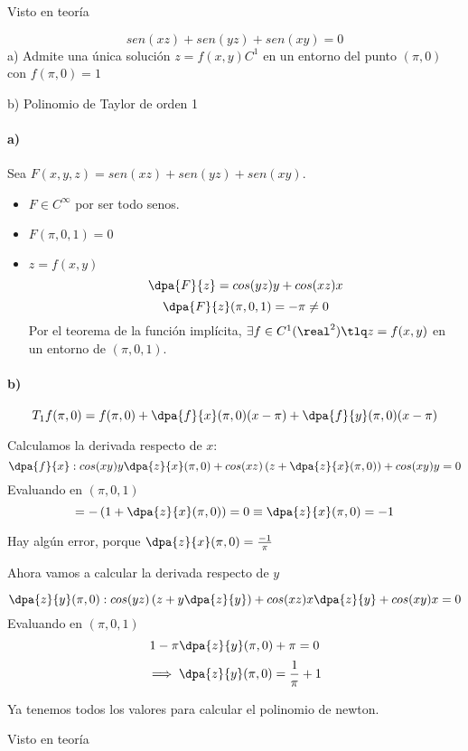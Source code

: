  \begin{problem}[14]
 \solution
 Visto en teoría
 \end{problem}
 
\begin{problem}[15]
\[sen(xz)+sen(yz)+sen(xy) = 0\]
a) Admite una única solución $z=f(x,y) C^1$ en un entorno del punto $(\pi,0)$ con $f(\pi,0) = 1$

b) Polinomio de Taylor de orden 1

\solution
\paragraph{a)}
Sea $F(x,y,z) = sen(xz)+sen(yz)+sen(xy)$.
\begin{itemize}
\item $F \in C^{\infty}$ por ser todo senos.
\item $F(\pi,0,1) = 0$
\item $z = f(x,y)$
\[\dpa{F}{z} = cos(yz)y + cos(xz)x\]
\[\dpa{F}{z}(\pi,0,1) = -\pi \neq 0\]
Por el teorema de la función implícita, $\exists f \in C^1(\real^2) \tlq z = f(x,y)$ en un entorno de $(\pi,0,1)$.
\end{itemize}
\paragraph{b)}
\[T_1f(\pi,0) =  f(\pi,0) + \dpa{f}{x}(\pi,0)(x-\pi) + \dpa{f}{y}(\pi,0)(x-\pi)\]

Calculamos la derivada respecto de $x$:
\[\dpa{f}{x} : cos(xy)y\dpa{z}{x}(\pi,0) + cos(xz)\left(z+\dpa{z}{x}(\pi,0)\right) + cos(xy)y = 0\]
Evaluando en $(\pi,0,1)$
\[= -\left(1+\dpa{z}{x}(\pi,0)\right) = 0 \equiv \dpa{z}{x}(\pi,0) = -1\]

Hay algún error, porque
$ \dpa{z}{x}(\pi,0) = \frac{-1}{\pi}$

Ahora vamos a calcular la derivada respecto de $y$

\[\dpa{z}{y}(\pi,0): cos(yz)\left(z+y\dpa{z}{y}\right) + cos(xz)x\dpa{z}{y} + cos(xy)x = 0\]
Evaluando en $(\pi,0,1)$
\[1-\pi\dpa{z}{y}(\pi,0) + \pi = 0\]
\[\implies \dpa{z}{y}(\pi,0)= \frac{1}{\pi} + 1\]

Ya tenemos todos los valores para calcular el polinomio de newton.
\end{problem}
 
  \begin{problem}[16]
 \solution
 Visto en teoría
 \end{problem}
 
